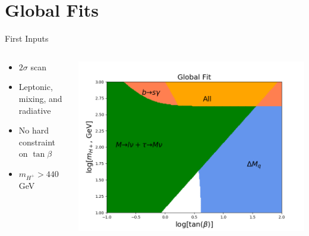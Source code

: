 \documentclass[10pt,xcolor={table,dvipsnames},t]{beamer}
\begin{document}
\section{Global Fits}
\begin{frame}{First Inputs}
    \begin{columns}[T]
        \begin{column}{0.33\textwidth}
            \vspace{1.5em}
            \begin{itemize}
                \item $2\sigma$ scan
                \item Leptonic, mixing, and radiative
                \item No hard constraint on $\tan\beta$
                \item $m_{H^+} > 440\,$GeV
            \end{itemize}
        \end{column}
        \begin{column}{0.60\textwidth}
            \includegraphics[scale=0.35]{global}
        \end{column}
    \end{columns}
\end{frame}
\end{document}
